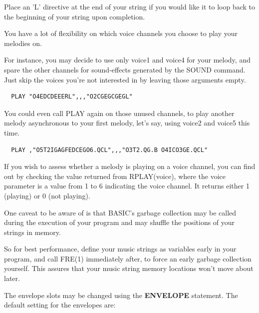 \begin{description}[leftmargin=2cm,style=nextline]
  Place an 'L' directive at the end of your string if you would like it to loop back to the
  beginning of your string upon completion.

  You have a lot of flexibility on which voice channels you choose to play your melodies on.

  For instance, you may decide to use only voice1 and voice4 for your melody, and spare
  the other channels for sound-effects generated by the SOUND command. Just skip the voices
  you're not interested in by leaving those arguments empty.

\begin{tcolorbox}[colback=black,coltext=white]
\verbatimfont{\codefont}
\begin{verbatim}
  PLAY "O4EDCDEEERL",,,"O2CGEGCGEGL"
\end{verbatim}
\end{tcolorbox}

  You could even call PLAY again on those unused channels, to play another melody
  asynchronous to your first melody, let's say, using voice2 and voice5 this time.

\begin{tcolorbox}[colback=black,coltext=white]
\verbatimfont{\codefont}
\begin{verbatim}
  PLAY ,"O5T2IGAGFEDCEGO6.QCL",,,"O3T2.QG.B O4ICO3GE.QCL"
\end{verbatim}
\end{tcolorbox}

  If you wish to assess whether a melody is playing on a voice channel, you can
  find out by checking the value returned from RPLAY(voice), where the voice parameter
  is a value from 1 to 6 indicating the voice channel. It returns either 1 (playing)
  or 0 (not playing).

  One caveat to be aware of is that BASIC's garbage collection may be called during the
  execution of your program and may shuffle the positions of your strings in memory.

  So for best performance, define your music strings as variables early in your program,
  and call FRE(1) immediately after, to force an early garbage collection yourself.
  This assures that your music string memory locations won't move about later.

\newpage

The envelope slots may be changed using the {\bf ENVELOPE}
statement. The default setting for the envelopes are:


\end{description}
